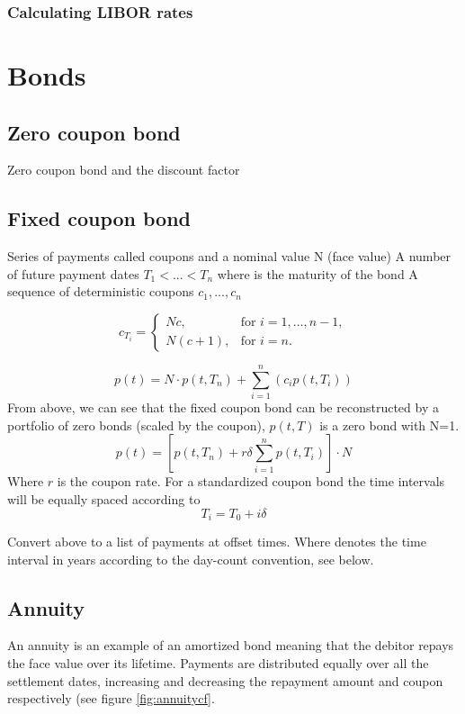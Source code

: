 \subsubsection{Calculating LIBOR rates}

\section{Bonds}

\subsection{Zero coupon bond}
Zero coupon bond and the discount factor

\subsection{Fixed coupon bond}
Series of payments called coupons and a nominal value N (face value)
A number of future payment dates $T_1 < ... < T_n$ where is the maturity of the bond
A sequence of deterministic coupons $c_1, ..., c_n$

\[ c_{T_i} = \left\{
\begin{array}{ll}
  Nc, & \text{for } i=1,...,n-1,  \\
  N(c+1), &\text{for } i=n.
\end{array} \right.\]

\[
p(t) = N \cdot p(t,T_n)+\sum_{i=1}^{n} (c_ip(t,T_i))
\]
From above, we can see that the fixed coupon bond can be reconstructed by a portfolio of zero
bonds (scaled by the coupon), $p(t,T)$ is a zero bond with N=1.
\[
p(t)=\left[p(t,T_n)+r\delta\sum_{i=1}^{n} p(t,T_i)\right]\cdot N
\]
Where $r$ is the coupon rate. For a standardized coupon bond the time intervals will be equally
spaced according to
\[
T_i=T_0+i\delta
\]

Convert above to a list of payments at offset times. Where denotes the time interval in years
according to the day-count convention, see below.

\subsection{Annuity}

An annuity is an example of an amortized bond meaning that the debitor repays the
face value over its lifetime. Payments are distributed equally over all the settlement
dates, increasing and decreasing the repayment amount and coupon respectively (see figure
\ref{fig:annuitycf}.

